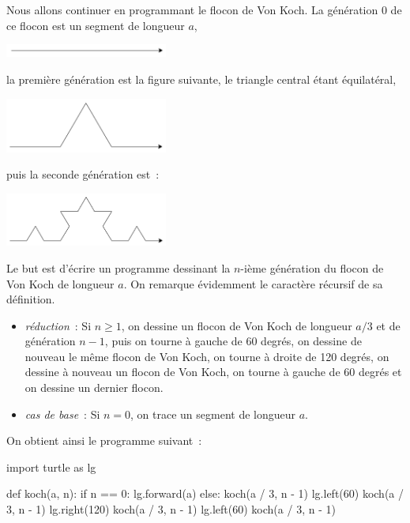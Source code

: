 \documentclass{magnolia}
\begin{document}
Nous allons continuer en programmant le flocon de Von Koch. La génération 0
de ce flocon est un segment de longueur $a$,
\begin{center}
\includegraphics[width=0.4\textwidth]{../../Commun/Images/python-cours-koch-0}
\end{center}
la première génération est la figure suivante, le \og triangle \fg central étant
équilatéral,
\begin{center}
\includegraphics[width=0.4\textwidth]{../../Commun/Images/python-cours-koch-1}
\end{center}
puis la seconde génération est~:
\begin{center}
\includegraphics[width=0.4\textwidth]{../../Commun/Images/python-cours-koch-2}
\end{center}
Le but est d'écrire un programme dessinant la $n$-ième génération du flocon de
Von Koch de longueur $a$. On remarque évidemment le caractère récursif de sa
définition.
\begin{itemize}
\item \emph{réduction}~: Si $n\geq 1$, on dessine un flocon de Von Koch de longueur
  $a/3$ et de génération $n-1$, puis on tourne à gauche de 60 degrés, on
  dessine de nouveau le même flocon de Von Koch, on tourne à droite de 120 degrés,
  on dessine à nouveau un flocon de Von Koch, on tourne à gauche de 60 degrés
  et on dessine un dernier flocon.
\item \emph{cas de base}~: Si $n=0$, on trace un segment de longueur $a$.
\end{itemize}
On obtient ainsi le programme suivant~:
\begin{pythoncodeline}
import turtle as lg

def koch(a, n):
    if n == 0:
        lg.forward(a)
    else:
        koch(a / 3, n - 1)
        lg.left(60)
        koch(a / 3, n - 1)
        lg.right(120)
        koch(a / 3, n - 1)
        lg.left(60)
        koch(a / 3, n - 1)
\end{pythoncodeline}
\end{document}

